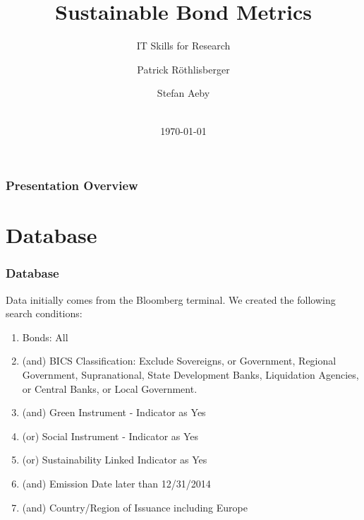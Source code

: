 \documentclass[
	8pt, %
]{beamer}
\title[Sustainable Bonds]{Sustainable Bond Metrics}
\subtitle{IT Skills for Research}
\author[Patrick Röthlisberger \and Stefan Aeby]{Patrick Röthlisberger \and Stefan Aeby} %
\institute[UC]{University of Zürich \\ \smallskip \textit{roer@zhaw.ch} \textit{aebystefan@gmail.com}}
\date[\today]{\\ \today} %
\begin{document}

\begin{frame}
	\titlepage %
\end{frame}



\begin{frame}
	\frametitle{Presentation Overview} 
	
	\tableofcontents
\end{frame}


\section{Database} 

\begin{frame}
	\frametitle{Database}
	
	Data initially comes from the \alert{Bloomberg} terminal. We created the following search conditions:
 \bigskip %
 \begin{enumerate}
    \item Bonds: All
    \item (and) BICS Classification: Exclude Sovereigns, or Government, Regional Government, Supranational, State Development Banks, Liquidation Agencies, or Central Banks, or Local Government.
    \item (and) Green Instrument - Indicator as Yes
    \item (or) Social Instrument - Indicator as Yes
    \item (or) Sustainability Linked Indicator as Yes
    \item (and) Emission Date later than 12/31/2014
    \item (and) Country/Region of Issuance including Europe
\end{enumerate}
\end{frame}
\end{document}
